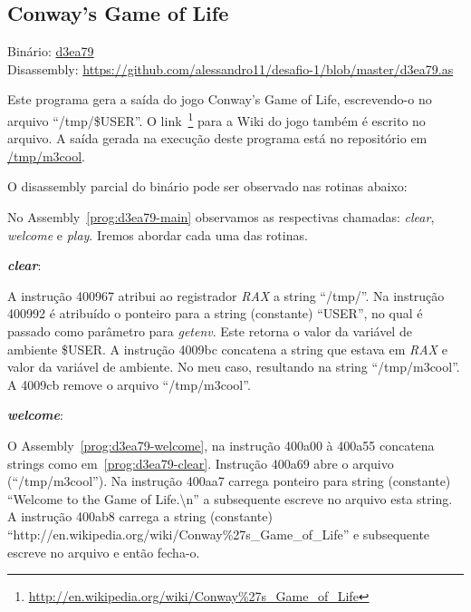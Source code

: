 \subsection{Conway's Game of Life}
\noindent Binário: \href{https://s3.amazonaws.com/chaordic-desafio-cloud/d3ea79}{d3ea79}\\
Disassembly: \href{https://github.com/alessandro11/desafio-1/blob/master/d3ea79.as}{https://github.com/alessandro11/desafio-1/blob/master/d3ea79.as}\\
\par
Este programa gera a saída do jogo Conway's Game of Life,
escrevendo-o no arquivo ``/tmp/\$USER''. O
link~\footnote{\href{http://en.wikipedia.org/wiki/Conway\%27s\_Game\_of\_Life}{http://en.wikipedia.org/wiki/Conway\%27s\_Game\_of\_Life}}
para a Wiki do jogo também é escrito no arquivo. A saída gerada na
execução deste programa está no repositório em
\href{https://github.com/alessandro11/desafio-1/blob/master/m3cool}{/tmp/m3cool}.

O disassembly parcial do binário pode ser observado nas rotinas abaixo:



No Assembly~\ref{prog:d3ea79-main} observamos as respectivas chamadas:
\emph{clear}, \emph{welcome} e \emph{play}. Iremos abordar cada uma das rotinas.\\

\par\textbf{\emph{clear}}:


A instrução 400967 atribui ao registrador \emph{RAX}
a string ``/tmp/''. Na instrução 400992 é atribuído o ponteiro para a
string (constante) ``USER'', no qual é passado como parâmetro para
\emph{getenv}. Este retorna o valor da variável de ambiente \$USER.
A instrução 4009bc concatena a string que estava em \emph{RAX} e valor da
variável de ambiente. No meu caso, resultando na string
``/tmp/m3cool''. A 4009cb remove o arquivo ``/tmp/m3cool''.\\

\par\textbf{\emph{welcome}}:


O Assembly~\ref{prog:d3ea79-welcome}, na instrução 400a00 à 400a55
concatena strings como em~\ref{prog:d3ea79-clear}. Instrução 400a69
abre o arquivo (``/tmp/m3cool''). Na instrução 400aa7 carrega ponteiro
para string (constante) ``Welcome to the Game of Life.\textbackslash n'' a
subsequente escreve no arquivo esta string. A instrução 400ab8 carrega a
string (constante) ``http://en.wikipedia.org/wiki/Conway\%27s\_Game\_of\_Life'' e
subsequente escreve no arquivo e então fecha-o.\\


